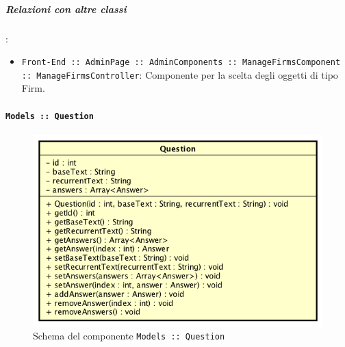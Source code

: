 \documentclass[../DefinizioneDiProdotto_v2.0.0.tex]{subfiles}
\begin{document}
		\subparagraph{Relazioni con altre classi}:
		      \begin{itemize}
		      	\item \texttt{Front-End :: AdminPage :: AdminComponents :: ManageFirmsComponent :: ManageFirmsController}: Componente per la scelta degli oggetti di tipo Firm.
		      \end{itemize}

	\newpage
	\paragraph{\texttt{Models :: Question}}
	\acapo
	\begin{figure}[!h]
		\centering
		\includegraphics[scale=0.6]{Architettura/Front-End/Models/Question.png}
		\caption{Schema del componente \texttt{Models :: Question}}
	\end{figure}
\end{document}
